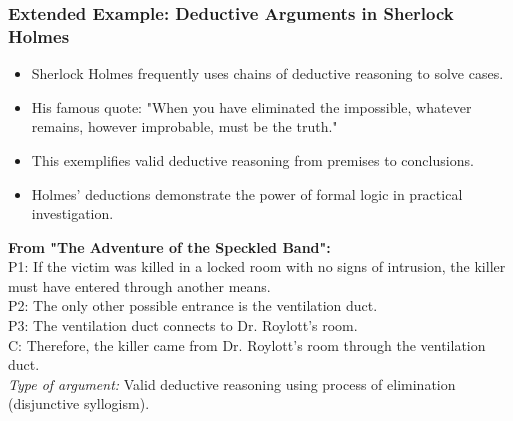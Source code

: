 \documentclass{beamer}
\begin{document}
\begin{frame}
    \frametitle{Extended Example: Deductive Arguments in Sherlock Holmes}
    \begin{itemize}
        \item Sherlock Holmes frequently uses chains of deductive reasoning to solve cases.
        \item His famous quote: "When you have eliminated the impossible, whatever remains, however improbable, must be the truth."
        \item This exemplifies valid deductive reasoning from premises to conclusions.
        \item Holmes' deductions demonstrate the power of formal logic in practical investigation.
    \end{itemize}
    
    \begin{example}
        \scriptsize
    \textbf{From "The Adventure of the Speckled Band":}\\
    
    P1: If the victim was killed in a locked room with no signs of intrusion, the killer must have entered through another means.\\
    
    P2: The only other possible entrance is the ventilation duct.\\
    
    P3: The ventilation duct connects to Dr. Roylott's room.\\
    
    C: Therefore, the killer came from Dr. Roylott's room through the ventilation duct.\\
    
    \textit{Type of argument:} Valid deductive reasoning using process of elimination (disjunctive syllogism).
    \end{example}

\end{frame}
\end{document}
